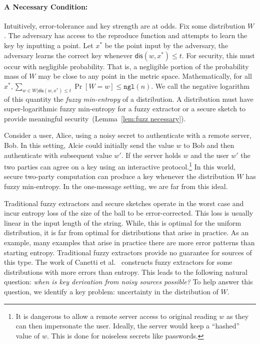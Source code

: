 \documentclass[11pt]{article}
\newcommand{\lemref}[1]{\mbox{Lemma~\ref{#1}}}
\newcommand{\dis}{\ensuremath{\mathsf{dis}}}
\newcommand{\ngl}{\ensuremath{\mathtt{ngl}}\xspace}
\begin{document}
\paragraph{A Necessary Condition:}  Intuitively, error-tolerance and key strength are at odds.  Fix some distribution $W$.  The adversary has access to the reproduce function and attempts to learn the key by inputting a point.  Let $x^*$ be the point input by the adversary, the adversary learns the correct key whenever $\dis(w, x^*)\le t$.  For security, this must occur with negligible probability.  That is, a negligible portion of the probability mass of $W$ may be close to any point in the metric space.  Mathematically, for all $x^*, \sum_{w\in W | \dis(w, x^*)\le t} \Pr[ W= w] \le \ngl(n)$.  We call the negative logarithm of this quantity the \emph{fuzzy min-entropy} of a distribution.  A distribution must have super-logarithmic fuzzy min-entropy for a fuzzy extractor or a secure sketch  to provide meaningful security~(\lemref{lem:fuzz necessary}).  

Consider a user, Alice, using a noisy secret to authenticate with a remote server, Bob.  In this setting, Alcie could initially send the value $w$ to Bob and then authenticate with subsequent value $w'$.  If the server holds $w$ and the user $w'$ the two parties can agree on a key using an interactive protocol.\footnote{It is dangerous to allow a remote server access to original reading $w$ as they can then impersonate the user.  Ideally, the server would keep a ``hashed'' value of $w$.  This is  done for noiseless secrets like passwords.}  In this world, secure two-party computation can produce a key whenever the distribution $W$ has fuzzy min-entropy.
In the one-message setting, we are far from this ideal.


Traditional fuzzy extractors and secure sketches operate in the worst case and incur entropy loss of the size of the ball to be error-corrected.  This loss is usually linear in the input length of the string.  While, this is optimal for the uniform distribution, it is far from optimal for distributions that arise in practice.  As an example, many examples that arise in practice there are more error patterns than starting entropy.  Traditional fuzzy extractors provide no guarantee for sources of this type.  The work of Canetti et al.~\cite{canetti2014key} constructs fuzzy  extractors for some distributions with more errors than entropy.  This leads to the following natural question: \emph{when is key derivation from noisy sources possible?}  To help answer this question, we identify a key problem: uncertainty in the distribution of $W$.
\end{document}
